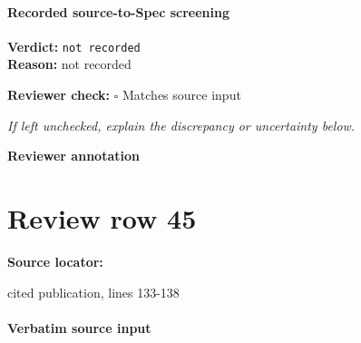 \documentclass[10pt]{article}
\newcommand{\reviewerbox}{%
  \par\noindent\fbox{\parbox{0.96\linewidth}{\rule{0pt}{0.38in}}}\par
}
\newcommand{\reviewmatch}[1]{%
  \par\noindent\textbf{Reviewer check:} $\square$\; #1\par
  \noindent\emph{If left unchecked, explain the discrepancy or uncertainty below.}\par
}
\begin{document}
\paragraph{Recorded source-to-Spec screening}
\textbf{Verdict:} \texttt{not recorded}
\\
\textbf{Reason:} not recorded
\reviewmatch{Matches source input}
\noindent\textbf{Reviewer annotation}\par
\reviewerbox
\clearpage
\hypertarget{source-claim-7751231944a77b74}{}
\section*{Review row 45}
\textbf{Source locator:} {\footnotesize\raggedright cited publication, lines 133-\allowbreak{}138\par}
\paragraph{Verbatim source input}
\end{document}
